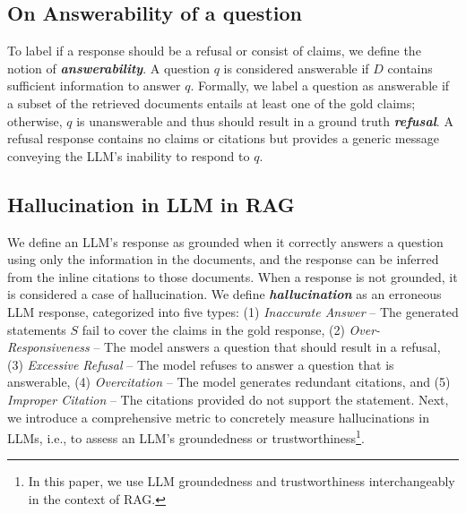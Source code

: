 \documentclass{article} %
\begin{document}
\subsection{On Answerability of a question} \label{sec: answerability}
To label if a response should be a refusal or consist of claims, we define the notion of \textit{\textbf{answerability}}. A question \(q\) is considered answerable if $D$ contains sufficient information to answer \(q\). Formally, we label a question as answerable if a subset of the retrieved documents entails at least one of the gold claims; otherwise, \(q\) is unanswerable and thus should result in a ground truth \textit{\textbf{refusal}}. A refusal response contains no claims or citations but provides a generic message conveying the LLM's inability to respond to \(q\).

\subsection{Hallucination in LLM in RAG} \label{sec:hallucinations}
We define an LLM's response as grounded when it correctly answers a question using only the information in the documents, and the response can be inferred from the inline citations to those documents. When a response is not grounded, it is considered a case of hallucination. We define \textbf{\textit{hallucination}} as an erroneous LLM response, categorized into five types: (1) \textit{Inaccurate Answer} – The generated statements \(S\) fail to cover the claims in the gold response, (2) \textit{Over-Responsiveness} – The model answers a question that should result in a refusal, (3) \textit{Excessive Refusal} – The model refuses to answer a question that is answerable, (4) \textit{Overcitation} – The model generates redundant citations, and (5) \textit{Improper Citation} – The citations provided do not support the statement. Next, we introduce a comprehensive metric to concretely measure hallucinations in LLMs, i.e., to assess an LLM's groundedness or trustworthiness\footnote{In this paper, we use LLM groundedness and trustworthiness interchangeably in the context of RAG.}.

\end{document}
